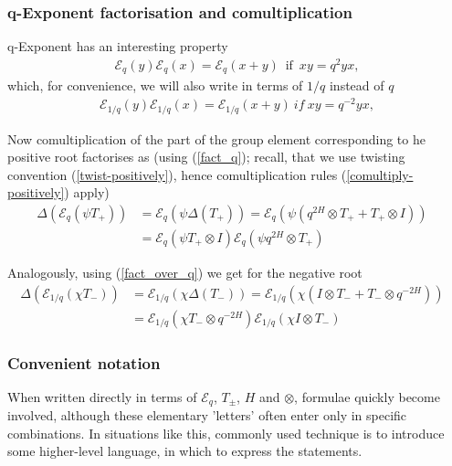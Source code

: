 \documentclass{article}
\newcommand{\lb}{\left (}
\newcommand{\rb}{\right )}
\newcommand{\lsb}{\left [}
\newcommand{\rsb}{\right ]}
\newcommand{\be}{\begin{eqnarray}}
\newcommand{\ee}{\end{eqnarray}}
\DeclareMathOperator{\If}{if}
\newcommand {\?}{\textit{???}}
\newcommand{\me}[0]{\mathcal{E}}
\def\dg{\Delta (g)}
\def\gog{g \otimes g}
\newcommand{\comul}[1]{\Delta \lb #1 \rb}
\newcommand{\delabel}[1]{(\ref{#1})}
\begin{document}


\subsubsection{q-Exponent factorisation and comultiplication}
q-Exponent has an interesting property
\be
\me_q(y)\me_q(x) = \me_q(x + y)\ \If \ xy = q^2 yx, \label{fact_q}
\ee
which, for convenience, we will also write in terms of $1/q$ instead of $q$
\be
\me_{1/q}(y)\me_{1/q}(x) = \me_{1/q}(x + y)\ if\ xy = q^{-2} yx, \label{fact_over_q}
\ee

Now comultiplication of the part of the group element corresponding to he positive root factorises as
(using \delabel{fact_q}; recall, that we use twisting convention \delabel{twist-positively}, hence
comultiplication rules \delabel{comultiply-positively} apply)
\be
\label{comul-expt-positive-sl2}
\comul{\me_q \lb \psi T_+ \rb} & = \me_q \lb \psi \comul{T_+}\rb = \me_q \lb \psi \lb q^{2H} \otimes T_+ + T_+ \otimes I \rb \rb & \\
& = \me_q \lb \psi T_+ \otimes I\rb \me_q \lb \psi q^{2H} \otimes T_+\rb
\ee

Analogously, using (\ref{fact_over_q}) we get for the negative root
\be
\label{comul-expt-negative-sl2}
\comul{\me_{1/q} \lb \chi T_- \rb} & = \me_{1/q} \lb \chi \comul{T_-}\rb = \me_{1/q} \lb \chi \lb I \otimes T_- + T_- \otimes q^{-2H} \rb \rb & \\
& = \me_{1/q} \lb \chi T_- \otimes q^{-2H}\rb \me_{1/q} \lb \chi I \otimes T_-\rb
\ee

\subsubsection{Convenient notation}

When written directly in terms of $\me_q$, $T_\pm$, $H$ and $\otimes$, formulae quickly become involved,
although these elementary 'letters' often enter only in specific combinations.
In situations like this, commonly used technique is to introduce some higher-level language,
in which to express the statements.
\end{document}

